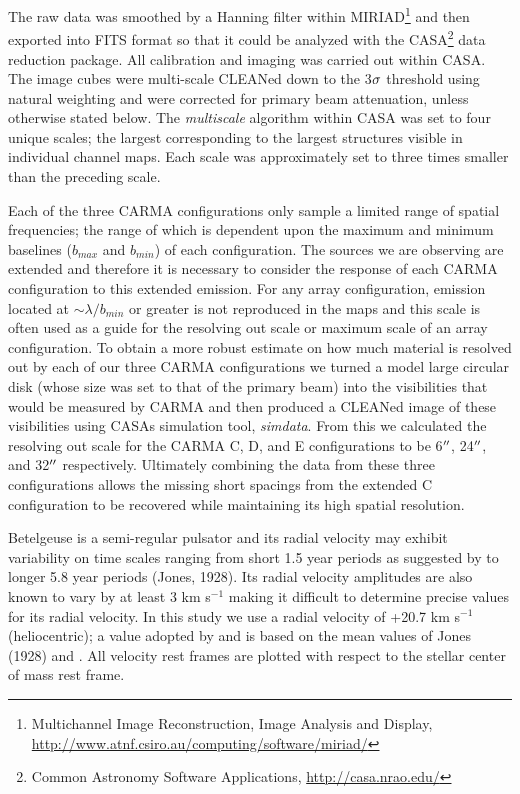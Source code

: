 \documentclass[preprint2]{aastex}
\begin{document}
The raw data was smoothed by a Hanning filter within MIRIAD\footnote{Multichannel Image Reconstruction, Image Analysis and Display, \url{http://www.atnf.csiro.au/computing/software/miriad/}} and then exported into FITS format so that it could be analyzed with the CASA\footnote{Common Astronomy Software Applications, \url{http://casa.nrao.edu/}} data reduction package. All calibration and imaging was carried out within CASA. The image cubes  were multi-scale  CLEANed down to the 3$\rm{\sigma}$ threshold using natural weighting and were corrected for primary beam attenuation, unless otherwise stated below. The \textit{multiscale} algorithm \citep{2008AJ....136.2897R} within CASA was set to four unique scales; the largest corresponding to the largest structures visible in individual channel maps. Each scale was approximately set to three times smaller than the preceding scale. 

Each of the three CARMA configurations only sample a limited range of spatial frequencies; the range of which is dependent upon the maximum and minimum baselines ($b_{max}$ and $b_{min}$) of each configuration. The sources we are observing are extended and therefore it is necessary to consider the response of each CARMA configuration to this extended emission. For any array configuration, emission located at $\sim \lambda/b_{min}$ or greater is not reproduced in the maps \citep{1999ASPC..180.....T} and this scale is often used as a guide for the resolving out scale or maximum scale of an array configuration. To obtain a more robust estimate on how much material is resolved out by each of our three CARMA configurations we turned a model large circular disk (whose size was set to that of the primary beam) into the visibilities that would be measured by CARMA and then produced a CLEANed image of these visibilities using CASAs simulation tool, \textit{simdata}. From this we calculated the resolving out scale for the CARMA C, D, and E configurations to be 6$\mbox{$^{\prime\prime}$}$, 24$\mbox{$^{\prime\prime}$}$, and 32$\mbox{$^{\prime\prime}$}$ respectively. Ultimately combining the data from these three configurations allows the missing short spacings from the extended C configuration to be recovered while maintaining its high spatial resolution.

Betelgeuse is a  semi-regular pulsator and its radial velocity may exhibit variability on time scales ranging from short 1.5 year periods as suggested by \cite{1931PWasO..15..178S} to longer 5.8 year periods (Jones, 1928). Its radial velocity amplitudes are also known to vary by at least 3 km s${}^{-1}$ \citep{1989AJ.....98.2233S} making it difficult to determine precise values for its radial velocity. In this study we use a radial velocity of +20.7 km s${}^{-1}$ (heliocentric); a value adopted by \citet{2008AJ....135.1430H} and is based on the mean values of Jones (1928) and \cite{1933CMWCI.464....1S}. All velocity rest frames are plotted with respect to the stellar center of mass rest frame. 
\end{document}
